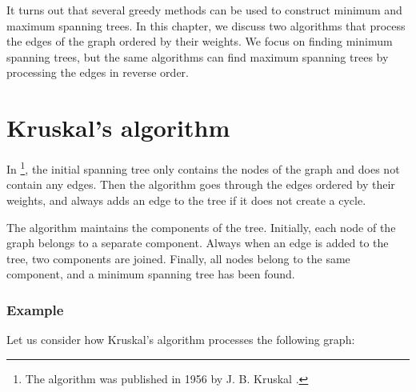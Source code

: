 It turns out that several greedy methods
can be used to construct minimum and maximum
spanning trees.
In this chapter, we discuss two algorithms
that process
the edges of the graph ordered by their weights.
We focus on finding minimum spanning trees,
but the same algorithms can find
maximum spanning trees by processing the edges in reverse order.

\section{Kruskal's algorithm}


In \footnote{The algorithm was published in 1956
by J. B. Kruskal \cite{kru56}.}, the initial spanning tree
only contains the nodes of the graph
and does not contain any edges.
Then the algorithm goes through the edges
ordered by their weights, and always adds an edge
to the tree if it does not create a cycle.

The algorithm maintains the components
of the tree.
Initially, each node of the graph
belongs to a separate component.
Always when an edge is added to the tree,
two components are joined.
Finally, all nodes belong to the same component,
and a minimum spanning tree has been found.

\subsubsection{Example}

\begin{samepage}
Let us consider how Kruskal's algorithm processes the
following graph:
\begin{center}
\end{center}
\end{samepage}

